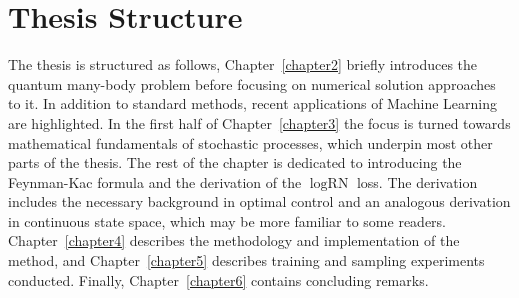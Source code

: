 \section{Thesis Structure}
\label{sec:structure}
The thesis is structured as follows, Chapter~\ref{chapter2} briefly introduces the quantum many-body problem before focusing on numerical solution approaches to it. In addition to standard methods, recent applications of Machine Learning are highlighted. In the first half of Chapter~\ref{chapter3} the focus is turned towards mathematical fundamentals of stochastic processes, which underpin most other parts of the thesis. The rest of the chapter is dedicated to introducing the Feynman-Kac formula and the derivation of the $\log \text{RN}$ loss. The derivation includes the necessary background in optimal control and an analogous derivation in continuous state space, which may be more familiar to some readers. Chapter~\ref{chapter4} describes the methodology and implementation of the method, and Chapter~\ref{chapter5} describes training and sampling experiments conducted. Finally, Chapter~\ref{chapter6} contains concluding remarks.







